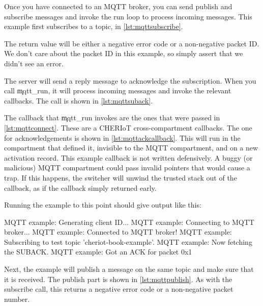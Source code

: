 Once you have connected to an MQTT broker, you can send publish and subscribe messages and invoke the run loop to process incoming messages.
This example first subscribes to a topic, in \ref{lst:mqttsubscribe}.

\codelisting[filename=examples/mqtt/mqtt.cc,marker=subscribe,label=lst:mqttsubscribe,caption="Subscribing to an MQTT topic."]{}

The return value will be either a negative error code or a non-negative packet ID.
We don't care about the packet ID in this example, so simply assert that we didn't see an error.


The server will send a reply message to acknowledge the subscription.
When you call \c{mqtt_run}, it will process incoming messages and invoke the relevant callbacks.
The call is shown in \ref{lst:mqttsuback}.

\codelisting[filename=examples/mqtt/mqtt.cc,marker=suback,label=lst:mqttsuback,caption="Waiting for acknowledgement after subscribing to an MQTT topic."]{}

The callback that \c{mqtt_run} invokes are the ones that were passed in \ref{lst:mqttconnect}.
These are a CHERIoT cross-compartment callbacks.
The one for acknowledgements is shown in \ref{lst:mqttackcallback}.
This will run in the compartment that defined it, invisible to the MQTT compartment, and on a new  activation record.
This example callback is not written defensively.
A buggy (or malicious) MQTT compartment could pass invalid pointers that would cause a trap.
If this happens, the switcher will unwind the trusted stack out of the callback, as if the callback simply returned early.

\codelisting[filename=examples/mqtt/mqtt.cc,marker=ack_callback,label=lst:mqttackcallback,caption="Callback for acknowledging MQTT messages."]{}

Running the example to this point should give output like this:

\begin{console}
MQTT example: Generating client ID...
MQTT example: Connecting to MQTT broker...
MQTT example: Connected to MQTT broker!
MQTT example: Subscribing to test topic 'cheriot-book-example'.
MQTT example: Now fetching the SUBACK.
MQTT example: Got an ACK for packet 0x1
\end{console}

Next, the example will publish a message on the same topic and make sure that it is received.
The publish part is shown in \ref{lst:mqttpublish}.
As with the subscribe call, this returns a negative error code or a non-negative packet number.

